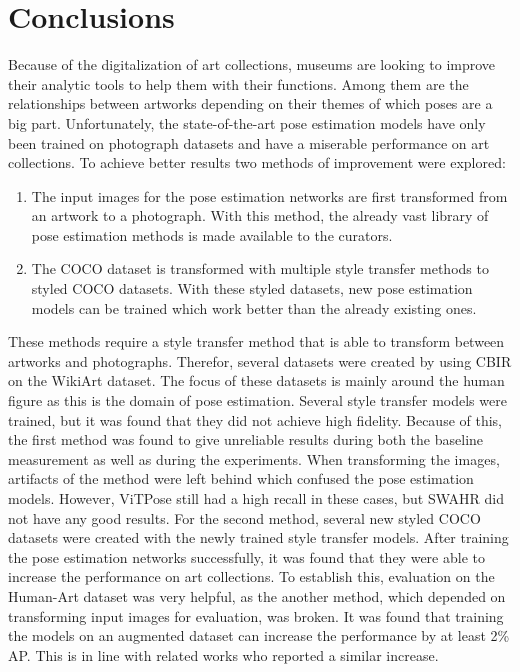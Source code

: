 \chapter{Conclusions}
\label{chap:conclusion}

Because of the digitalization of art collections, museums are looking to improve their analytic tools to help them with their functions.
Among them are the relationships between artworks depending on their themes of which poses are a big part.
Unfortunately, the state-of-the-art pose estimation models have only been trained on photograph datasets and have a miserable performance on art collections.
To achieve better results two methods of improvement were explored:
\begin{enumerate}
    \item The input images for the pose estimation networks are first transformed from an artwork to a photograph.
    With this method, the already vast library of pose estimation methods is made available to the curators.
    \item The COCO dataset is transformed with multiple style transfer methods to styled COCO datasets.
    With these styled datasets, new pose estimation models can be trained which work better than the already existing ones.
\end{enumerate}
These methods require a style transfer method that is able to transform between artworks and photographs.
Therefor, several datasets were created by using CBIR on the WikiArt dataset.
The focus of these datasets is mainly around the human figure as this is the domain of pose estimation.
Several style transfer models were trained, but it was found that they did not achieve high fidelity.
Because of this, the first method was found to give unreliable results during both the baseline measurement as well as during the experiments.
When transforming the images, artifacts of the method were left behind which confused the pose estimation models.
However, ViTPose still had a high recall in these cases, but SWAHR did not have any good results.
For the second method, several new styled COCO datasets were created with the newly trained style transfer models.
After training the pose estimation networks successfully, it was found that they were able to increase the performance on art collections.
To establish this, evaluation on the Human-Art dataset was very helpful, as the another method, which depended on transforming input images for evaluation, was broken.
It was found that training the models on an augmented dataset can increase the performance by at least 2\% AP.
This is in line with related works who reported a similar increase.

